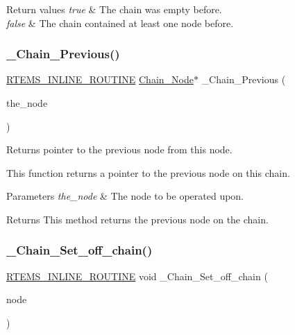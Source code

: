 \begin{DoxyRetVals}{Return values}
{\em true} & The chain was empty before. \\
\hline
{\em false} & The chain contained at least one node before. \\
\hline
\end{DoxyRetVals}
\mbox{\label{group__RTEMSScoreChain_ga78b26f26fab1b3831f449e7a94a51692}} 
\subsubsection{\texorpdfstring{\_Chain\_Previous()}{\_Chain\_Previous()}}
{\footnotesize\ttfamily \mbox{\hyperlink{group__RTEMSScoreBaseDefs_gac216239df231d5dbd15e3520b0b9313f}{R\+T\+E\+M\+S\+\_\+\+I\+N\+L\+I\+N\+E\+\_\+\+R\+O\+U\+T\+I\+NE}} \mbox{\hyperlink{group__RTEMSScoreChain_ga0dd4bfcca1ac7f90de2842e447846d3d}{Chain\+\_\+\+Node}}$\ast$ \+\_\+\+Chain\+\_\+\+Previous (\begin{DoxyParamCaption}\item[{const \mbox{\hyperlink{group__RTEMSScoreChain_ga0dd4bfcca1ac7f90de2842e447846d3d}{Chain\+\_\+\+Node}} $\ast$}]{the\+\_\+node }\end{DoxyParamCaption})}



Returns pointer to the previous node from this node. 

This function returns a pointer to the previous node on this chain.


\begin{DoxyParams}{Parameters}
{\em the\+\_\+node} & The node to be operated upon.\\
\hline
\end{DoxyParams}
\begin{DoxyReturn}{Returns}
This method returns the previous node on the chain. 
\end{DoxyReturn}
\mbox{\label{group__RTEMSScoreChain_gadf0e5d55d133694eed8043ec13fe1266}} 
\subsubsection{\texorpdfstring{\_Chain\_Set\_off\_chain()}{\_Chain\_Set\_off\_chain()}}
{\footnotesize\ttfamily \mbox{\hyperlink{group__RTEMSScoreBaseDefs_gac216239df231d5dbd15e3520b0b9313f}{R\+T\+E\+M\+S\+\_\+\+I\+N\+L\+I\+N\+E\+\_\+\+R\+O\+U\+T\+I\+NE}} void \+\_\+\+Chain\+\_\+\+Set\+\_\+off\+\_\+chain (\begin{DoxyParamCaption}\item[{\mbox{\hyperlink{group__RTEMSScoreChain_ga0dd4bfcca1ac7f90de2842e447846d3d}{Chain\+\_\+\+Node}} $\ast$}]{node }\end{DoxyParamCaption})}



